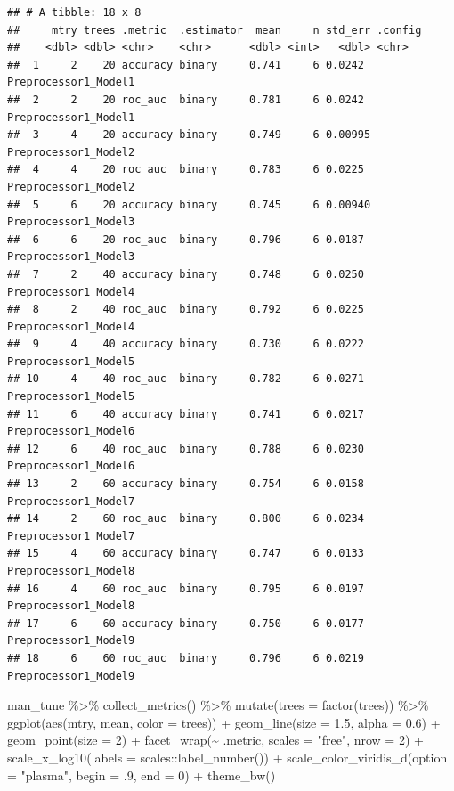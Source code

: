 \documentclass[
]{article}
\newenvironment{Shaded}{\begin{snugshade}}{\end{snugshade}}
\newcommand{\AttributeTok}[1]{\textcolor[rgb]{0.77,0.63,0.00}{#1}}
\newcommand{\DecValTok}[1]{\textcolor[rgb]{0.00,0.00,0.81}{#1}}
\newcommand{\FloatTok}[1]{\textcolor[rgb]{0.00,0.00,0.81}{#1}}
\newcommand{\FunctionTok}[1]{\textcolor[rgb]{0.00,0.00,0.00}{#1}}
\newcommand{\NormalTok}[1]{#1}
\newcommand{\SpecialCharTok}[1]{\textcolor[rgb]{0.00,0.00,0.00}{#1}}
\newcommand{\StringTok}[1]{\textcolor[rgb]{0.31,0.60,0.02}{#1}}
\begin{document}
\begin{verbatim}
## # A tibble: 18 x 8
##     mtry trees .metric  .estimator  mean     n std_err .config             
##    <dbl> <dbl> <chr>    <chr>      <dbl> <int>   <dbl> <chr>               
##  1     2    20 accuracy binary     0.741     6 0.0242  Preprocessor1_Model1
##  2     2    20 roc_auc  binary     0.781     6 0.0242  Preprocessor1_Model1
##  3     4    20 accuracy binary     0.749     6 0.00995 Preprocessor1_Model2
##  4     4    20 roc_auc  binary     0.783     6 0.0225  Preprocessor1_Model2
##  5     6    20 accuracy binary     0.745     6 0.00940 Preprocessor1_Model3
##  6     6    20 roc_auc  binary     0.796     6 0.0187  Preprocessor1_Model3
##  7     2    40 accuracy binary     0.748     6 0.0250  Preprocessor1_Model4
##  8     2    40 roc_auc  binary     0.792     6 0.0225  Preprocessor1_Model4
##  9     4    40 accuracy binary     0.730     6 0.0222  Preprocessor1_Model5
## 10     4    40 roc_auc  binary     0.782     6 0.0271  Preprocessor1_Model5
## 11     6    40 accuracy binary     0.741     6 0.0217  Preprocessor1_Model6
## 12     6    40 roc_auc  binary     0.788     6 0.0230  Preprocessor1_Model6
## 13     2    60 accuracy binary     0.754     6 0.0158  Preprocessor1_Model7
## 14     2    60 roc_auc  binary     0.800     6 0.0234  Preprocessor1_Model7
## 15     4    60 accuracy binary     0.747     6 0.0133  Preprocessor1_Model8
## 16     4    60 roc_auc  binary     0.795     6 0.0197  Preprocessor1_Model8
## 17     6    60 accuracy binary     0.750     6 0.0177  Preprocessor1_Model9
## 18     6    60 roc_auc  binary     0.796     6 0.0219  Preprocessor1_Model9
\end{verbatim}

\begin{Shaded}
\begin{Highlighting}[]
\NormalTok{man\_tune }\SpecialCharTok{\%\textgreater{}\%}
  \FunctionTok{collect\_metrics}\NormalTok{() }\SpecialCharTok{\%\textgreater{}\%}
  \FunctionTok{mutate}\NormalTok{(}\AttributeTok{trees =} \FunctionTok{factor}\NormalTok{(trees)) }\SpecialCharTok{\%\textgreater{}\%}
  \FunctionTok{ggplot}\NormalTok{(}\FunctionTok{aes}\NormalTok{(mtry, mean, }\AttributeTok{color =}\NormalTok{ trees)) }\SpecialCharTok{+}
  \FunctionTok{geom\_line}\NormalTok{(}\AttributeTok{size =} \FloatTok{1.5}\NormalTok{, }\AttributeTok{alpha =} \FloatTok{0.6}\NormalTok{) }\SpecialCharTok{+}
  \FunctionTok{geom\_point}\NormalTok{(}\AttributeTok{size =} \DecValTok{2}\NormalTok{) }\SpecialCharTok{+}
  \FunctionTok{facet\_wrap}\NormalTok{(}\SpecialCharTok{\textasciitilde{}}\NormalTok{ .metric, }\AttributeTok{scales =} \StringTok{"free"}\NormalTok{, }\AttributeTok{nrow =} \DecValTok{2}\NormalTok{) }\SpecialCharTok{+}
  \FunctionTok{scale\_x\_log10}\NormalTok{(}\AttributeTok{labels =}\NormalTok{ scales}\SpecialCharTok{::}\FunctionTok{label\_number}\NormalTok{()) }\SpecialCharTok{+}
  \FunctionTok{scale\_color\_viridis\_d}\NormalTok{(}\AttributeTok{option =} \StringTok{"plasma"}\NormalTok{, }\AttributeTok{begin =}\NormalTok{ .}\DecValTok{9}\NormalTok{, }\AttributeTok{end =} \DecValTok{0}\NormalTok{) }\SpecialCharTok{+}
  \FunctionTok{theme\_bw}\NormalTok{()}
\end{Highlighting}
\end{Shaded}
\end{document}
